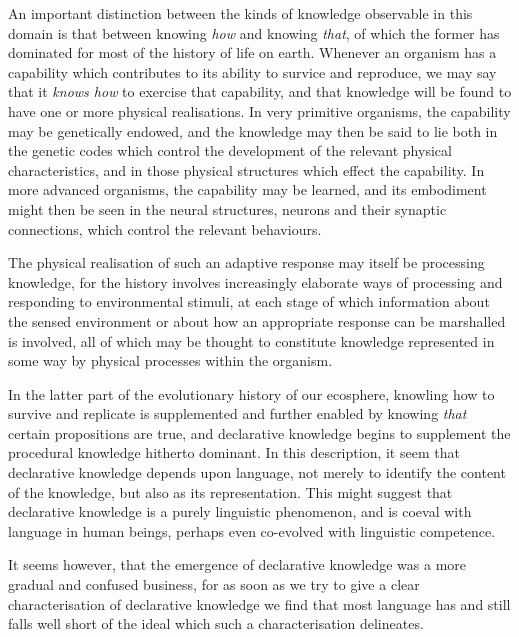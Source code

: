 An important distinction between the kinds of knowledge observable in this domain is that between knowing \emph{how} and knowing \emph{that}, of which the former has dominated for most of the history of life on earth.
Whenever an organism has a capability which contributes to its ability to survice and reproduce, we may say that it \emph{knows how} to exercise that capability, and that knowledge will be found to have one or more physical realisations.
In very primitive organisms, the capability may be genetically endowed, and the knowledge may then be said to lie both in the genetic codes which control the development of the relevant physical characteristics, and in those physical structures which effect the capability.
In more advanced organisms, the capability may be learned, and its embodiment might then be seen in the neural structures, neurons and their synaptic connections, which control the relevant behaviours.

The physical realisation of such an adaptive response may itself be processing knowledge, for the history involves increasingly elaborate ways of processing and responding to environmental stimuli, at each stage of which information about the sensed environment or about how an appropriate response can be marshalled is involved, all of which may be thought to constitute knowledge represented in some way by physical processes within the organism.

In the latter part of the evolutionary history of our ecosphere, knowling how to survive and replicate is supplemented and further enabled by knowing \emph{that} certain propositions are true, and declarative knowledge begins to supplement the procedural knowledge hitherto dominant.
In this description, it seem that declarative knowledge depends upon language, not merely to identify the content of the knowledge, but also as its representation.
This might suggest that declarative knowledge is a purely linguistic phenomenon, and is coeval with language in human beings, perhaps even co-evolved with linguistic competence.

It seems however, that the emergence of declarative knowledge was a more gradual and confused business, for as soon as we try to give a clear characterisation of declarative knowledge we find that most language has and still falls well short of the ideal which such a characterisation delineates.
